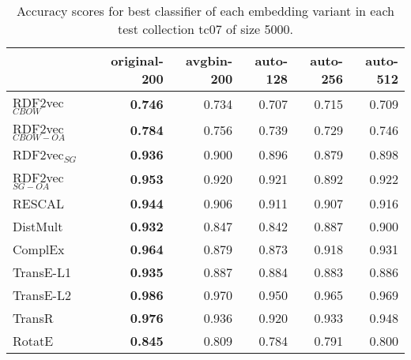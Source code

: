 \documentclass[11pt,titlepage,oneside,openany]{book}
\begin{document}
\begin{table}[h!]
\centering
\begin{tabular}{lrrrrr}
\toprule
{} &  original-200 &  avgbin-200 &  auto-128 &  auto-256 &  auto-512 \\
\midrule
RDF2vec$_{CBOW}$     &	\textbf{0.746} &       0.734  &     0.707  &     0.715  &     0.709  \\
RDF2vec$_{CBOW-OA}$  &	\textbf{0.784} &       0.756  &     0.739  &     0.729  &     0.746  \\
RDF2vec$_{SG}$       &	\textbf{0.936} &       0.900  &     0.896  &     0.879  &     0.898  \\
RDF2vec$_{SG-OA}$    &	\textbf{0.953} &       0.920  &     0.921  &     0.892  &     0.922  \\
RESCAL               &	\textbf{0.944} &       0.906  &     0.911  &     0.907  &     0.916  \\
DistMult             &	\textbf{0.932} &       0.847  &     0.842  &     0.887  &     0.900  \\
ComplEx              &	\textbf{0.964} &       0.879  &     0.873  &     0.918  &     0.931  \\
TransE-L1            &	\textbf{0.935} &       0.887  &     0.884  &     0.883  &     0.886  \\
TransE-L2            &	\textbf{0.986} &       0.970  &     0.950  &     0.965  &     0.969  \\
TransR               &	\textbf{0.976} &       0.936  &     0.920  &     0.933  &     0.948  \\
RotatE               &	\textbf{0.845} &       0.809  &     0.784  &     0.791  &     0.800  \\
\bottomrule
\end{tabular}
\caption{Accuracy scores for best classifier of each embedding variant in each test collection tc07 of size 5000.}
\label{tab:dlcc-acc-tc07-5000}
\end{table}
\end{document}
